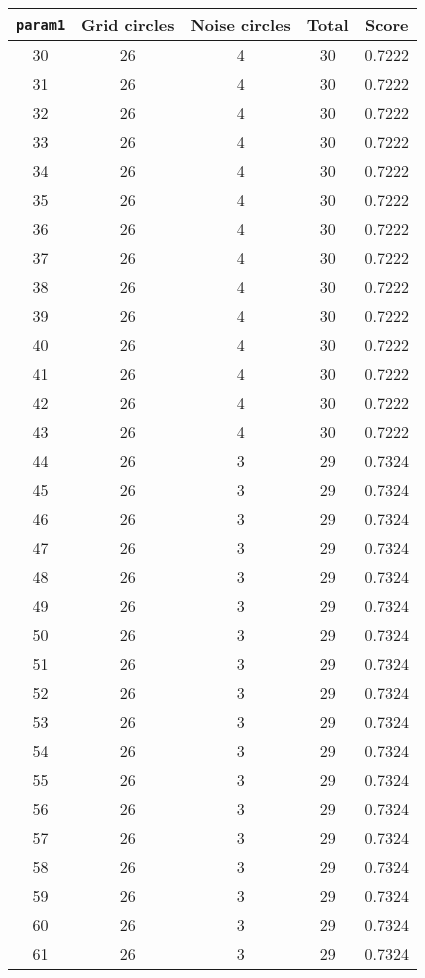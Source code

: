 \documentclass[letterpaper, 12pt]{article}
\begin{document}
\begin{longtable}{|c|c|c|c|c|}
\hline
\textbf{\texttt{param1}} & \textbf{Grid circles} & \textbf{Noise circles} & \textbf{Total} & \textbf{Score} \\
\hline
30 & 26 & 4 & 30 & 0.7222 \\
\hline
31 & 26 & 4 & 30 & 0.7222 \\
\hline
32 & 26 & 4 & 30 & 0.7222 \\
\hline
33 & 26 & 4 & 30 & 0.7222 \\
\hline
34 & 26 & 4 & 30 & 0.7222 \\
\hline
35 & 26 & 4 & 30 & 0.7222 \\
\hline
36 & 26 & 4 & 30 & 0.7222 \\
\hline
37 & 26 & 4 & 30 & 0.7222 \\
\hline
38 & 26 & 4 & 30 & 0.7222 \\
\hline
39 & 26 & 4 & 30 & 0.7222 \\
\hline
40 & 26 & 4 & 30 & 0.7222 \\
\hline
41 & 26 & 4 & 30 & 0.7222 \\
\hline
42 & 26 & 4 & 30 & 0.7222 \\
\hline
43 & 26 & 4 & 30 & 0.7222 \\
\hline
44 & 26 & 3 & 29 & 0.7324 \\
\hline
45 & 26 & 3 & 29 & 0.7324 \\
\hline
46 & 26 & 3 & 29 & 0.7324 \\
\hline
47 & 26 & 3 & 29 & 0.7324 \\
\hline
48 & 26 & 3 & 29 & 0.7324 \\
\hline
49 & 26 & 3 & 29 & 0.7324 \\
\hline
50 & 26 & 3 & 29 & 0.7324 \\
\hline
51 & 26 & 3 & 29 & 0.7324 \\
\hline
52 & 26 & 3 & 29 & 0.7324 \\
\hline
53 & 26 & 3 & 29 & 0.7324 \\
\hline
54 & 26 & 3 & 29 & 0.7324 \\
\hline
55 & 26 & 3 & 29 & 0.7324 \\
\hline
56 & 26 & 3 & 29 & 0.7324 \\
\hline
57 & 26 & 3 & 29 & 0.7324 \\
\hline
58 & 26 & 3 & 29 & 0.7324 \\
\hline
59 & 26 & 3 & 29 & 0.7324 \\
\hline
60 & 26 & 3 & 29 & 0.7324 \\
\hline
61 & 26 & 3 & 29 & 0.7324 \\

\end{longtable}
\end{document}

